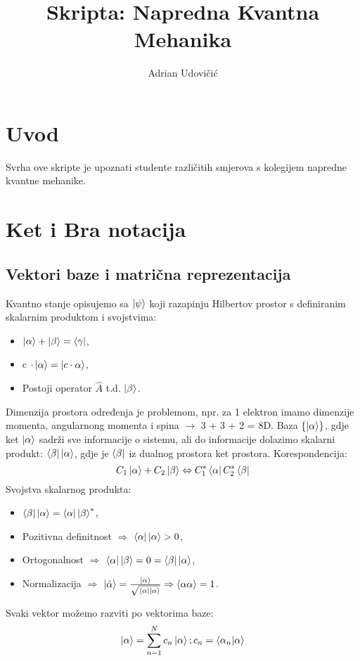 \documentclass{article}
\title{Skripta: Napredna Kvantna Mehanika}
\author{Adrian Udovičić}
\numberwithin{equation}{section}
\begin{document}
\maketitle
{}
\section*{\centering Uvod}

Svrha ove skripte je upoznati studente različitih smjerova s kolegijem napredne kvantne mehanike.

\vfill

\begin{center}
	\tableofcontents
\end{center}
\vfill
\newpage

\section{Ket i Bra notacija}
\subsection{Vektori baze i matrična reprezentacija}
Kvantno stanje opisujemo sa $\ket{\psi}$ koji razapinju Hilbertov prostor s definiranim skalarnim produktom i svojstvima:
\begin{itemize}
	\item $\ket{\alpha} + \ket{\beta} = \bra{\gamma}$,
	\item c $\cdot \ket{\alpha} = \ket{c \cdot \alpha}$,
	\item Postoji operator $\hat{A}$ t.d. $\ket{\beta}$.
\end{itemize}
Dimenzija prostora određenja je problemom, npr. za 1 elektron imamo dimenzije momenta,
angularnong momenta i spina $\rightarrow$ 3 + 3 + 2 = 8D. Baza  $\left\{\ket{\alpha}\right\}$, gdje ket $\ket{\alpha}$ sadrži sve informacije o sistemu, ali do informacije dolazimo skalarni produkt:
$\bra{\beta}\ket{\alpha}$, gdje je $\bra{\beta}$ iz dualnog prostora ket prostora.
Korespondencija:
\begin{equation}
	C_1\ket{\alpha} + C_2 \ket{\beta} \Leftrightarrow C_1^*\bra{\alpha} C_2^*\bra{\beta}
\end{equation}
Svojstva skalarnog produkta:
\begin{itemize}
	\item  $\bra{\beta}\ket{\alpha} = \bra{\alpha}\ket{\beta}^*$,
	\item Pozitivna definitnost $\Rightarrow$ $\bra{\alpha}\ket{\alpha} > 0$,
	\item Ortogonalnost $\Rightarrow$ $\bra{\alpha}\ket{\beta} = 0 =\bra{\beta}\ket{\alpha}$,
	\item Normalizacija $\Rightarrow$ $\ket{\hat{\alpha}} = \frac{\ket{\alpha}}{\sqrt{\bra{\alpha}\ket{\alpha}}} \Rightarrow \braket{\alpha \alpha} = 1$.
\end{itemize}
Svaki vektor možemo razviti po vektorima baze:
\begin{equation}
	\ket{\alpha} = \sum_{n=1}^{N}c_n\ket{\alpha}; c_n = \braket{\alpha_n|\alpha}
\end{equation}
\end{document}
